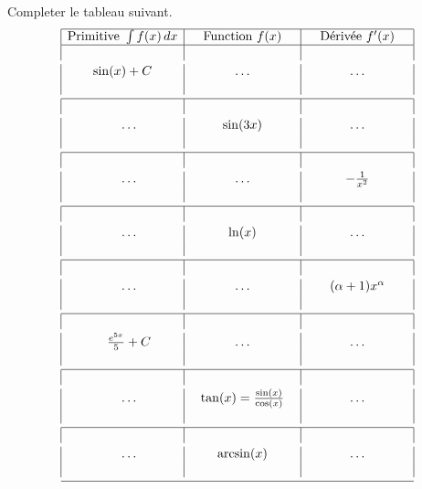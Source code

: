 \begin{exercice}\label{exomazhe-0009}

Completer le tableau suivant. 
  \begin{equation}
    \begin{array}{|c|c|c|}\hline 
      \textrm{Primitive } \int f(x)\, dx & \quad\textrm{Function } f(x)\quad &\quad \textrm{D\'eriv\'ee } f'(x)\quad \\\hline 
      \vspace{1mm}&&\\
      \quad\sin(x)+C\quad & \quad\ldots \quad&\quad \ldots \quad\\
      \vspace{1mm}&&\\\hline
      \vspace{1mm}&&\\
      \quad\ldots & \sin(3x) & \ldots \\
      \vspace{1mm}&&\\\hline 
      \vspace{1mm}&&\\
      \quad\ldots & \ldots & -\frac{1}{x^2}\\
      \vspace{1mm}&&\\\hline 
      \vspace{1mm}&&\\
      \quad\ldots & \ln(x) & \ldots \\
      \vspace{1mm}&&\\\hline 
      \vspace{1mm}&&\\
      \quad\ldots & \ldots & \quad(\alpha+1)x^\alpha\quad \\
      \vspace{1mm}&&\\\hline 
      \vspace{1mm}&&\\
      \quad\frac{e^{5x}}{5}+C & \ldots & \ldots \\
      \vspace{1mm}&&\\\hline 
      \vspace{1mm}&&\\
      \quad\ldots  & \tan(x)=\frac{\sin(x)}{\cos(x)} & \ldots \\
      \vspace{1mm}&&\\\hline 
      \vspace{1mm}&&\\
      \quad\ldots  &\quad \arcsin(x)\quad & \ldots \\
      \vspace{1mm}&&\\\hline 
    \end{array}
  \end{equation}
  

  
\end{exercice}
